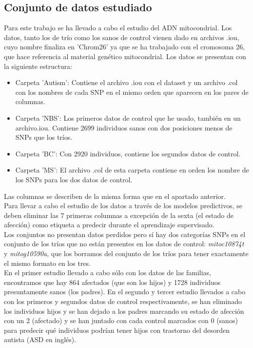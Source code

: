 \subsection{Conjunto de datos estudiado}
Para este trabajo se ha llevado a cabo el estudio del ADN mitocondrial. Los datos, tanto los de trío como los sanos de control vienen dado en archivos .iou, cuyo nombre finaliza en 'Chrom26' ya que se ha trabajado con el cromosoma 26, que hace referencia al material genético mitocondrial. Los datos se presentan con la siguiente estructura:\\
\begin{itemize}
  \item Carpeta 'Autism': Contiene el archivo .iou con el dataset y un archivo .col con los nombres de cada SNP en el mismo orden que aparecen en los pares de columnas.
  \item Carpeta 'NBS': Los primeros datos de control que he usado, también en un archivo.iou. Contiene 2699 individuos sanos con dos posiciones menos de SNPs que los tríos.
  \item Carpeta 'BC': Con 2920 individuos, contiene los segundos datos de control.
  \item Carpeta 'MS': El archivo .col de esta carpeta contiene en orden los nombre de los SNPs para los dos datos de control.
\end{itemize}
Las columnas se describen de la misma forma que en el apartado anterior.\\
Para llevar a cabo el estudio de los datos a través de los modelos predictivos, se deben eliminar las 7 primeras columnas a excepción de la sexta (el estado de afección) como etiqueta a predecir durante el aprendizaje supervisado.\\
Los conjuntos no presentan datos perdidos pero sí hay dos categorías SNPs en el conjunto de los tríos que no están presentes en los datos de control: \textit{mitoc10874t} y \textit{mitog10590a}, que los borramos del conjunto de los tríos para tener exactamente el mismo formato en los tres.\\
En el primer estudio llevado a cabo sólo con los datos de las familias, encontramos que hay 864 afectados (que son los hijos) y 1728 individuos presuntamente sanos (los padres). En el segundo y tercer estudio llevados a cabo con los primeros y segundos datos de control respectivamente, se han eliminado los individuos hijos y se han dejado a los padres marcando su estado de afección con un 2 (afectado) y se han juntado con cada control marcados con 0 (sanos) para predecir qué individuos podrían tener hijos con trastorno del desorden autista (ASD en inglés).
\endinput

%
%
%
%
%
%
%
%
%
%
%
%
%
%
%
%







